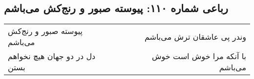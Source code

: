 \begin{center}
\section*{رباعی شماره ۱۱۰: پیوسته صبور و رنج‌کش می‌باشم}
\label{sec:110}
\begin{longtable}{l p{0.5cm} r}
پیوسته صبور و رنج‌کش می‌باشم
&&
وندر پی عاشقان ترش می‌باشم
\\
دل در دو جهان هیچ نخواهم بستن
&&
با آنکه مرا خوش است خوش می‌باشم
\\
\end{longtable}
\end{center}
